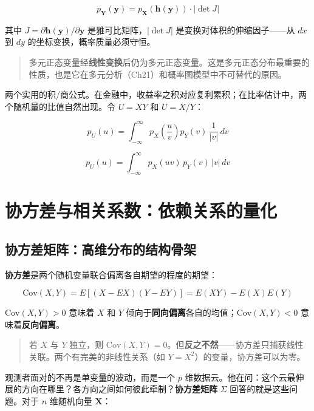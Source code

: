 \documentclass[
]{book}
\begin{document}
\[p_{\mathbf{Y}}(\mathbf{y}) = p_{\mathbf{X}}(\mathbf{h}(\mathbf{y})) \cdot |\det J|\]

其中 \(J = \partial \mathbf{h}(\mathbf{y}) / \partial \mathbf{y}\) 是雅可比矩阵，\(|\det J|\) 是变换对体积的伸缩因子------从 \(dx\) 到 \(dy\) 的坐标变换，概率质量必须守恒。

\begin{quote}
多元正态变量经\textbf{线性变换}后仍为多元正态变量。这是多元正态分布最重要的性质，也是它在多元分析（Ch21）和概率图模型中不可替代的原因。
\end{quote}

两个实用的积/商公式。在金融中，收益率之积对应复利累积；在比率估计中，两个随机量的比值自然出现。令 \(U = XY\) 和 \(U = X/Y\)：

\[p_U(u) = \int_{-\infty}^{\infty} p_X\left(\frac{u}{v}\right) p_Y(v) \, \frac{1}{|v|} \, dv\]

\[p_U(u) = \int_{-\infty}^{\infty} p_X(uv) \, p_Y(v) \, |v| \, dv\]

\section{协方差与相关系数：依赖关系的量化}\label{ux534fux65b9ux5deeux4e0eux76f8ux5173ux7cfbux6570ux4f9dux8d56ux5173ux7cfbux7684ux91cfux5316}

\subsection{协方差矩阵：高维分布的结构骨架}\label{ux534fux65b9ux5deeux77e9ux9635ux9ad8ux7ef4ux5206ux5e03ux7684ux7ed3ux6784ux9aa8ux67b6}

\textbf{协方差}是两个随机变量联合偏离各自期望的程度的期望：

\[\text{Cov}(X,Y) = E[(X - EX)(Y - EY)] = E(XY) - E(X)E(Y)\]

\(\text{Cov}(X,Y) > 0\) 意味着 \(X\) 和 \(Y\) 倾向于\textbf{同向偏离}各自的均值；\(\text{Cov}(X,Y) < 0\) 意味着\textbf{反向偏离}。

\begin{quote}
若 \(X\) 与 \(Y\) 独立，则 \(\text{Cov}(X,Y) = 0\)。但\textbf{反之不然}------协方差只捕获线性关联。两个有完美的非线性关系（如 \(Y = X^2\)）的变量，协方差可以为零。
\end{quote}

观测者面对的不再是单变量的波动，而是一个 \(p\) 维数据云。他在问：这个云最伸展的方向在哪里？各方向之间如何彼此牵制？\textbf{协方差矩阵} \(\Sigma\) 回答的就是这些问题。对于 \(n\) 维随机向量 \(\mathbf{X}\)：
\end{document}
